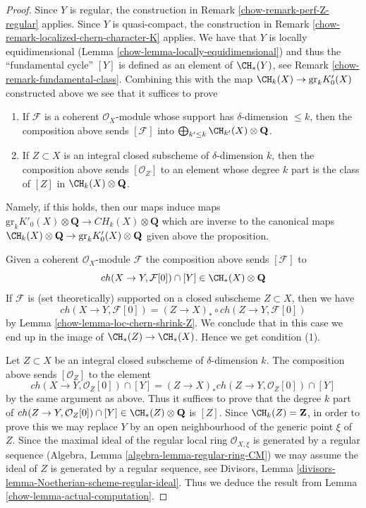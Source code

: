 \begin{proof}

Since $Y$ is regular, the construction in
Remark \ref{chow-remark-perf-Z-regular} applies.
Since $Y$ is quasi-compact, the construction in
Remark \ref{chow-remark-localized-chern-character-K} applies.
We have that $Y$ is locally equidimensional
(Lemma \ref{chow-lemma-locally-equidimensional}) and
thus the ``fundamental cycle'' $[Y]$ is defined
as an element of $\CH_*(Y)$, see Remark \ref{chow-remark-fundamental-class}.
Combining this with the map $\CH_k(X) \to \text{gr}_kK'_0(X)$
constructed above we see that it suffices to prove
\begin{enumerate}
\item If $\mathcal{F}$ is a coherent $\mathcal{O}_X$-module
whose support has $\delta$-dimension $\leq k$, then
the composition above sends $[\mathcal{F}]$ into
$\bigoplus_{k' \leq k} \CH_{k'}(X) \otimes \mathbf{Q}$.
\item If $Z \subset X$ is an integral closed subscheme
of $\delta$-dimension $k$, then the composition above
sends $[\mathcal{O}_Z]$ to an element whose degree $k$
part is the class of $[Z]$ in $\CH_k(X) \otimes \mathbf{Q}$.
\end{enumerate}
Namely, if this holds, then our maps induce maps
$\text{gr}_kK'_0(X) \otimes \mathbf{Q} \to CH_k(X) \otimes \mathbf{Q}$
which are inverse to the canonical maps
$\CH_k(X) \otimes \mathbf{Q} \to \text{gr}_k K'_0(X) \otimes \mathbf{Q}$
given above the proposition.

\medskip\noindent
Given a coherent $\mathcal{O}_X$-module $\mathcal{F}$
the composition above sends $[\mathcal{F}]$ to
$$
ch(X \to Y, \mathcal{F}[0]) \cap [Y] \in \CH_*(X) \otimes \mathbf{Q}
$$
If $\mathcal{F}$ is (set theoretically) supported on a closed subscheme
$Z \subset X$, then we have
$$
ch(X \to Y, \mathcal{F}[0]) = (Z \to X)_* \circ ch(Z \to Y, \mathcal{F}[0])
$$
by Lemma \ref{chow-lemma-loc-chern-shrink-Z}. We conclude that in this
case we end up in the image of $\CH_*(Z) \to \CH_*(X)$. Hence
we get condition (1).

\medskip\noindent
Let $Z \subset X$ be an integral closed subscheme of $\delta$-dimension $k$.
The composition above sends $[\mathcal{O}_Z]$ to the element
$$
ch(X \to Y, \mathcal{O}_Z[0]) \cap [Y] =
(Z \to X)_* ch(Z \to Y, \mathcal{O}_Z[0]) \cap [Y]
$$
by the same argument as above.
Thus it suffices to prove that the degree $k$ part of
$ch(Z \to Y, \mathcal{O}_Z[0]) \cap [Y] \in
\CH_*(Z) \otimes \mathbf{Q}$ is $[Z]$.
Since $\CH_k(Z) = \mathbf{Z}$, in order
to prove this we may replace $Y$ by an open neighbourhood of the
generic point $\xi$ of $Z$. Since the maximal ideal of the regular
local ring $\mathcal{O}_{X, \xi}$ is generated by a
regular sequence (Algebra, Lemma \ref{algebra-lemma-regular-ring-CM})
we may assume the ideal of $Z$ is generated by a regular sequence, see
Divisors, Lemma \ref{divisors-lemma-Noetherian-scheme-regular-ideal}.
Thus we deduce the result from Lemma \ref{chow-lemma-actual-computation}.
\end{proof}

